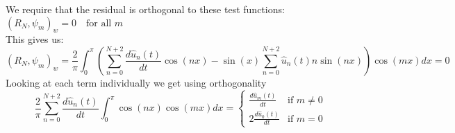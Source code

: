 We require that the residual is orthogonal to these test functions:
$(R_N, \psi_m)_w = 0 \quad \text{for all } m$\\
This gives us:
\begin{equation}
	\left(R_N, \psi_m\right)_w  = \frac{2}{\pi} \int_0^{\pi} \left ( \sum_{n=0}^{N+2} \frac{d\hat{u}_n(t)}{dt} \cos(nx) - \sin(x)  \sum_{n=0}^{N+2} \hat{u}_n(t) n \sin(nx) \right) \cos(mx) dx = 0
	\label{eq:res_der}
\end{equation}
Looking at each term individually we get using orthogonality
\begin{equation}
	\frac{2}{\pi}\sum_{n=0}^{N+2} \frac{d\hat{u}_n(t)}{dt} \int_0^\pi \cos(nx) \cos(mx) dx = \begin{cases}
		\frac{d\hat{u}_m(t)}{dt} & \text{if } m\neq 0 \\
		2\frac{d\hat{u}_0(t)}{dt} & \text{if } m=0
	\end{cases}
	\label{eq:ft3}
\end{equation}
